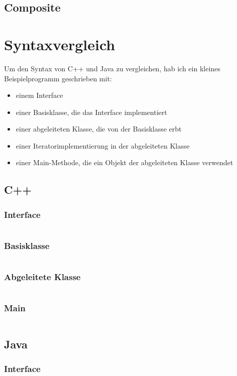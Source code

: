 \documentclass[12pt]{scrartcl}
\begin{document}
\subsection{Composite}

\pagebreak
\section{Syntaxvergleich}
Um den Syntax von C++ und Java zu vergleichen, hab ich ein kleines Beispielprogramm geschrieben mit:
\begin{itemize}
	\item einem Interface
	\item einer Basisklasse, die das Interface implementiert
	\item einer abgeleiteten Klasse, die von der Basisklasse erbt
	\item einer Iteratorimplementierung in der abgeleiteten Klasse
	\item einer Main-Methode, die ein Objekt der abgeleiteten Klasse verwendet
\end{itemize}

\subsection{C++}
\subsubsection{Interface}
\inputminted{cpp}{cpp/interface.h}
\subsubsection{Basisklasse}
\inputminted{cpp}{cpp/baseclass.h}
\subsubsection{Abgeleitete Klasse}
\inputminted{cpp}{cpp/derivedclass.h}
\subsubsection{Main}
\inputminted{cpp}{cpp/main.cpp}
\pagebreak

\subsection{Java}
\subsubsection{Interface}
\inputminted{java}{java/src/main/java/javademo/Interface.java}
\end{document}
